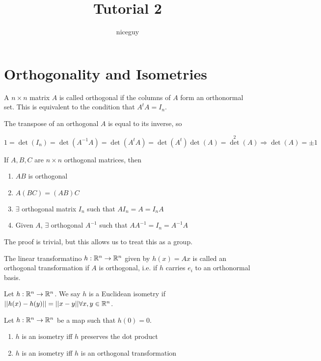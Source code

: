 \documentclass[12pt]{article}
\title{Tutorial 2}
\author{niceguy}
\begin{document}
\maketitle

\section{Orthogonality and Isometries}

\begin{defn}[Orthoganality]
    A $n \times n$ matrix $A$ is called orthogonal if the columns of $A$ form an orthonormal set. This is equivalent to the condition that $A^tA = I_n$.
\end{defn}

The transpose of an orthogonal $A$ is equal to its inverse, so

$$1 = \det(I_n) = \det(A^{-1}A) = \det(A^tA) = \det(A^t)\det(A) = \det^2(A) \Rightarrow \det(A) = \pm 1$$

\begin{thm}
    If $A, B, C$ are $n \times n$ orthogonal matrices, then
    \begin{enumerate}
        \item $AB$ is orthogonal
        \item $A(BC) = (AB)C$
        \item $\exists$ orthogonal matrix $I_n$ such that $AI_n = A = I_nA$
        \item Given $A$, $\exists$ orthogonal $A^{-1}$ such that $AA^{-1} = I_n = A^{-1}A$
    \end{enumerate}
\end{thm}

The proof is trivial, but this allows us to treat this as a group.

\begin{defn}
    The linear transformatino $h: \mathbb{R}^n \rightarrow \mathbb{R}^n$ given by $h(x) = Ax$ is called an orthogonal transformation if $A$ is orthogonal, i.e. if $h$ carries $e_i$ to an orthonormal basis.
\end{defn}

\begin{defn}
    Let $h:\mathbb{R}^n \rightarrow \mathbb{R}^n$. We say $h$ is a Euclidean isometry if $||h(x) - h(y)|| = ||x-y|| \forall x, y \in \mathbb{R}^n$.
\end{defn}

\begin{thm}
    Let $h:\mathbb{R}^n \rightarrow \mathbb{R}^n$ be a map such that $h(0) = 0$.
    \begin{enumerate}
        \item $h$ is an isometry iff $h$ preserves the dot product
        \item $h$ is an isometry iff $h$ is an orthogonal transformation
    \end{enumerate}
\end{thm}
\end{document}
